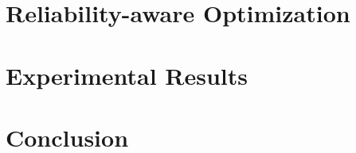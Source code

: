 \documentclass[conference]{IEEEtran}
\begin{document}
  \section{Reliability-aware Optimization} 
  

  \section{Experimental Results} 
  

  \section{Conclusion} 
  

  \appendix
  

  
  
\end{document}
